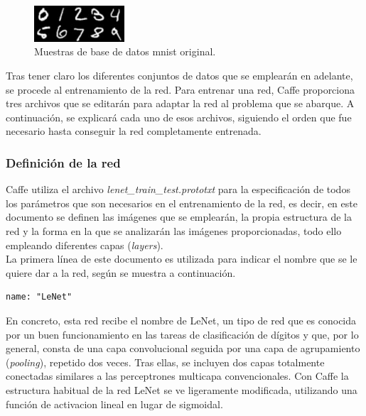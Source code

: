 \begin{figure}[H]
	\begin{center}
		\includegraphics[width=0.3\textwidth]{figures/original}
		\caption{Muestras de base de datos \acrshort{mnist} original.}
		\label{fig.digitosMNIST}
	\end{center}
\end{figure}

Tras tener claro los diferentes conjuntos de datos que se emplearán en adelante, se procede al entrenamiento de la red. Para entrenar una red, Caffe proporciona tres archivos que se editarán para adaptar la red al problema que se abarque. A continuación, se explicará cada uno de esos archivos, siguiendo el orden que fue necesario hasta conseguir la red completamente entrenada.

\subsubsection{Definición de la red}
	Caffe utiliza el archivo 
	\textit{lenet\_train\_test.prototxt} para la especificación de todos los parámetros que son necesarios en el entrenamiento de la red, es decir, en este documento se definen las imágenes que se emplearán, la propia estructura de la red y la forma en la que se analizarán las imágenes proporcionadas, todo ello empleando diferentes capas (\textit{layers}).\\

	La primera línea de este documento es utilizada para indicar el nombre que se le quiere dar a la red, según se muestra a continuación.
	\vspace{10pt}
	\begin{lstlisting}[frame=single]
	name: "LeNet"
	\end{lstlisting}
	
	En concreto, esta red recibe el nombre de LeNet, un tipo de red que es conocida por un buen funcionamiento en las tareas de clasificación de dígitos y que, por lo general, consta de una capa convolucional seguida por una capa de agrupamiento (\textit{pooling}), repetido dos veces. Tras ellas, se incluyen dos capas totalmente conectadas similares a las perceptrones multicapa convencionales. Con Caffe la estructura habitual de la red LeNet se ve ligeramente modificada, utilizando una función de activacion lineal en lugar de sigmoidal.\\

